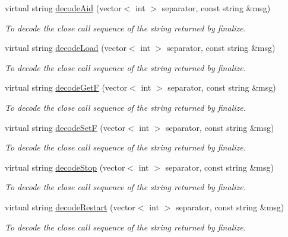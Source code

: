 \begin{DoxyCompactItemize}
virtual string \hyperlink{classIMSMapper_acf42261d8695e23bab65d61241716c20}{decodeAid} (vector$<$ int $>$ separator, const string \&msg)
\begin{DoxyCompactList}\small\item\em To decode the close call sequence of the string returned by finalize. \item\end{DoxyCompactList}\item 
virtual string \hyperlink{classIMSMapper_abe6d2e3537b551aa184b657a349d8cb2}{decodeLoad} (vector$<$ int $>$ separator, const string \&msg)
\begin{DoxyCompactList}\small\item\em To decode the close call sequence of the string returned by finalize. \item\end{DoxyCompactList}\item 
virtual string \hyperlink{classIMSMapper_a1481e2aec04b986736f769c364659eda}{decodeGetF} (vector$<$ int $>$ separator, const string \&msg)
\begin{DoxyCompactList}\small\item\em To decode the close call sequence of the string returned by finalize. \item\end{DoxyCompactList}\item 
virtual string \hyperlink{classIMSMapper_a87c4a9459c2823a089cc338c347ad4f6}{decodeSetF} (vector$<$ int $>$ separator, const string \&msg)
\begin{DoxyCompactList}\small\item\em To decode the close call sequence of the string returned by finalize. \item\end{DoxyCompactList}\item 
virtual string \hyperlink{classIMSMapper_a71be80fb21c0fe3cde1064d8379a0a67}{decodeStop} (vector$<$ int $>$ separator, const string \&msg)
\begin{DoxyCompactList}\small\item\em To decode the close call sequence of the string returned by finalize. \item\end{DoxyCompactList}\item 
virtual string \hyperlink{classIMSMapper_a949ccf0f3c1b9fcc93d0a3a444304ba0}{decodeRestart} (vector$<$ int $>$ separator, const string \&msg)
\begin{DoxyCompactList}\small\item\em To decode the close call sequence of the string returned by finalize. \item\end{DoxyCompactList}\item 

\end{DoxyCompactItemize}
